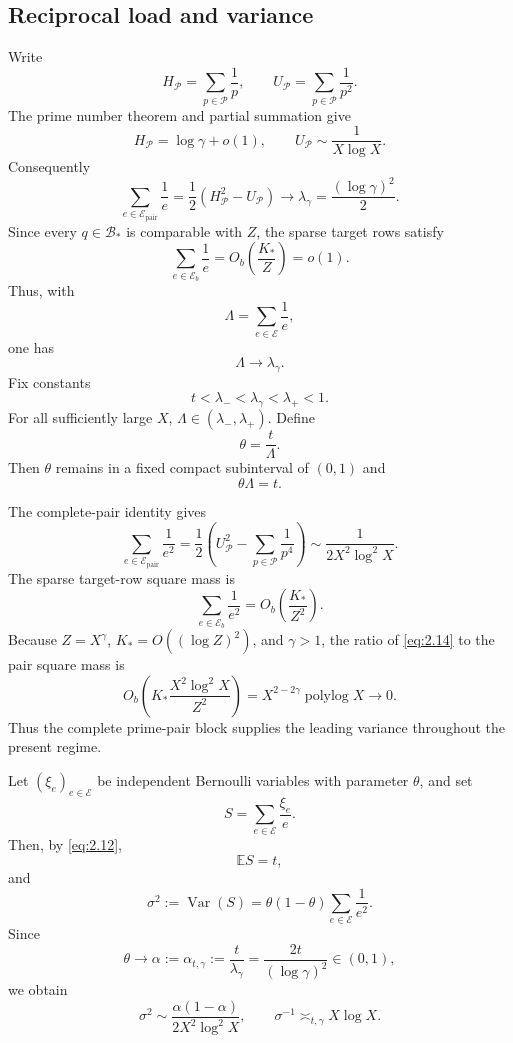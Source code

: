 \subsection{Reciprocal load and variance}

Write
\[
H_{\mathcal P}=\sum_{p\in\mathcal P}\frac1p,
\qquad
U_{\mathcal P}=\sum_{p\in\mathcal P}\frac1{p^2}.
\]
The prime number theorem and partial summation give
\[
H_{\mathcal P}=\log\gamma+o(1),
\qquad
U_{\mathcal P}\sim\frac1{X\log X}.
\tag{2.5}\label{eq:2.5}
\]
Consequently
\[
\sum_{e\in\mathcal E_{\mathrm{pair}}}\frac1e
=\frac12(H_{\mathcal P}^2-U_{\mathcal P})
\longrightarrow
\lambda_\gamma=\frac{(\log\gamma)^2}{2}.
\tag{2.6}\label{eq:2.6}
\]
Since every $q\in\mathcal B_*$ is comparable with $Z$, the sparse target rows satisfy
\[
\sum_{e\in\mathcal E_b}\frac1e
=O_b\!\left(\frac{K_*}{Z}\right)
=o(1).
\tag{2.7}\label{eq:2.7}
\]
Thus, with
\[
\Lambda=\sum_{e\in\mathcal E}\frac1e,
\tag{2.8}\label{eq:2.8}
\]
one has
\[
\Lambda\longrightarrow\lambda_\gamma.
\tag{2.9}\label{eq:2.9}
\]
Fix constants
\[
t<\lambda_-<\lambda_\gamma<\lambda_+<1.
\tag{2.10}\label{eq:2.10}
\]
For all sufficiently large $X$, $\Lambda\in(\lambda_-,\lambda_+)$. Define
\[
\theta=\frac{t}{\Lambda}.
\tag{2.11}\label{eq:2.11}
\]
Then $\theta$ remains in a fixed compact subinterval of $(0,1)$ and
\[
\theta\Lambda=t.
\tag{2.12}\label{eq:2.12}
\]

The complete-pair identity gives
\[
\sum_{e\in\mathcal E_{\mathrm{pair}}}\frac1{e^2}
=\frac12\left(U_{\mathcal P}^2-\sum_{p\in\mathcal P}\frac1{p^4}\right)
\sim
\frac1{2X^2\log^2X}.
\tag{2.13}\label{eq:2.13}
\]
The sparse target-row square mass is
\[
\sum_{e\in\mathcal E_b}\frac1{e^2}
=O_b\!\left(\frac{K_*}{Z^2}\right).
\tag{2.14}\label{eq:2.14}
\]
Because $Z=X^\gamma$, $K_*=O((\log Z)^2)$, and $\gamma>1$, the ratio of \eqref{eq:2.14} to the pair square mass is
\[
O_b\!\left(K_*\frac{X^2\log^2X}{Z^2}\right)
=X^{2-2\gamma}\operatorname{polylog}X
\longrightarrow0.
\]
Thus the complete prime-pair block supplies the leading variance throughout the present regime.

Let $(\xi_e)_{e\in\mathcal E}$ be independent Bernoulli variables with parameter $\theta$, and set
\[
S=\sum_{e\in\mathcal E}\frac{\xi_e}{e}.
\tag{2.15}\label{eq:2.15}
\]
Then, by \eqref{eq:2.12},
\[
\mathbb E S=t,
\tag{2.16}\label{eq:2.16}
\]
and
\[
\sigma^2:=\operatorname{Var}(S)
=\theta(1-\theta)
\sum_{e\in\mathcal E}\frac1{e^2}.
\tag{2.17}\label{eq:2.17}
\]
Since
\[
\theta\longrightarrow
\alpha:=\alpha_{t,\gamma}
:=\frac{t}{\lambda_\gamma}
=\frac{2t}{(\log\gamma)^2}\in(0,1),
\tag{2.18}\label{eq:2.18}
\]
we obtain
\[
\sigma^2
\sim
\frac{\alpha(1-\alpha)}{2X^2\log^2X},
\qquad
\sigma^{-1}\asymp_{t,\gamma}X\log X.
\tag{2.19}\label{eq:2.19}
\]

